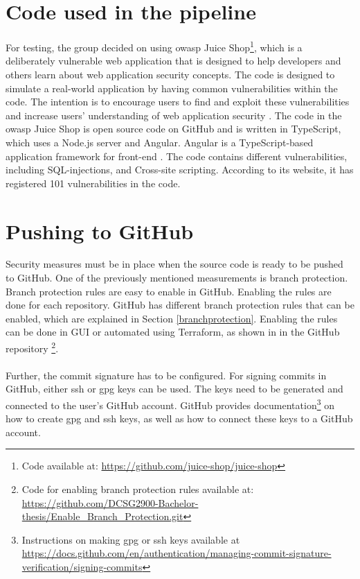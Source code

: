 \section{Code used in the pipeline}
For testing, the group decided on using \acrshort{owasp} Juice Shop\footnote{Code available at: \url{https://github.com/juice-shop/juice-shop}}, which is a deliberately vulnerable web application that is designed to help developers and others learn about web application security concepts. The code is designed to simulate a real-world application by having common vulnerabilities within the code. The intention is to encourage users to find and exploit these vulnerabilities and increase users' understanding of web application security \cite{owaspJuiceShop}. The code in the \acrshort{owasp} Juice Shop is open source code on GitHub and is written in TypeScript, which uses a Node.js server and Angular. Angular is a TypeScript-based application framework for \gls{front-end} \cite{owaspJuiceShopCode}. The code contains different vulnerabilities, including \gls{SQL-injection}s, and \gls{Cross-site scripting}. According to its website, it has registered 101 vulnerabilities in the code.

\section{Pushing to GitHub}
Security measures must be in place when the source code is ready to be pushed to GitHub. One of the previously mentioned measurements is branch protection. Branch protection rules are easy to enable in GitHub. Enabling the rules are done for each repository. GitHub has different branch protection rules that can be enabled, which are explained in Section \ref{branchprotection}. Enabling the rules can be done in \gls{GUI} or automated using Terraform, as shown in in the GitHub repository \footnote{Code for enabling branch protection rules available at: \url{https://github.com/DCSG2900-Bachelor-thesis/Enable_Branch_Protection.git}}. 
\\~\\
Further, the commit signature has to be configured. For signing commits in GitHub, either \acrshort{ssh} or \acrshort{gpg} keys can be used. The keys need to be generated and connected to the user's GitHub account. GitHub provides documentation\footnote{Instructions on making \acrshort{gpg} or \acrshort{ssh} keys available at \url{https://docs.github.com/en/authentication/managing-commit-signature-verification/signing-commits}} on how to create \acrshort{gpg} and \acrshort{ssh} keys, as well as how to connect these keys to a GitHub account.

